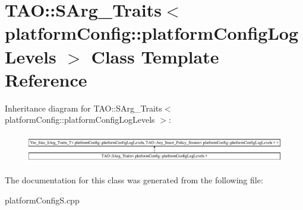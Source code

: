 \section{T\+AO\+:\+:S\+Arg\+\_\+\+Traits$<$ platform\+Config\+:\+:platform\+Config\+Log\+Levels $>$ Class Template Reference}
\label{classTAO_1_1SArg__Traits_3_01platformConfig_1_1platformConfigLogLevels_01_4}
Inheritance diagram for T\+AO\+:\+:S\+Arg\+\_\+\+Traits$<$ platform\+Config\+:\+:platform\+Config\+Log\+Levels $>$\+:\begin{figure}[H]
\begin{center}
\leavevmode
\includegraphics[height=1.311475cm]{classTAO_1_1SArg__Traits_3_01platformConfig_1_1platformConfigLogLevels_01_4}
\end{center}
\end{figure}


The documentation for this class was generated from the following file\+:\begin{DoxyCompactItemize}
\item 
platform\+Config\+S.\+cpp\end{DoxyCompactItemize}
